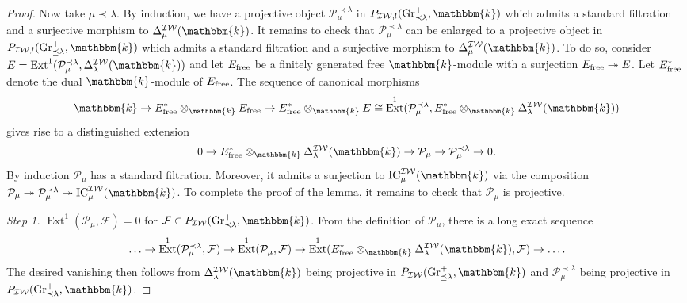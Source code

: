 \documentclass{amsart}
\renewcommand{\k}{\mathbbm{k}}
\newcommand{\scrF}{\mathcal{F}}
\newcommand{\scrP}{\mathcal{P}}
\newcommand{\IW}{\mathcal{IW}}
\DeclareMathOperator{\Ext}{Ext}
\DeclareMathOperator{\IC}{IC}
\DeclareMathOperator{\Gr}{Gr}
\theoremstyle{definition}
\begin{document}
\begin{proof}
        Now take $\mu \prec \lambda$. By induction, we have a projective object $\scrP_{\mu}^{\prec \lambda}$ in $P_{\IW, !} (\Gr_{\prec \lambda}^+, \k)$ which admits a standard filtration and a surjective morphism to $\Delta_{\mu}^{\IW} (\k)$.
        It remains to check that $\scrP_{\mu}^{\prec \lambda}$ can be enlarged to a projective object in  $P_{\IW, !} (\Gr_{\preceq \lambda}^+, \k)$ which admits a standard filtration and a surjective morphism to $\Delta_{\mu}^{\IW} (\k)$.
        To do so, consider $E = \Ext^1 (\scrP_{\mu}^{\prec \lambda}, \Delta_{\lambda}^{\IW} (\k))$ and let $E_{\textnormal{free}}$ be a finitely generated free $\k$-module with a surjection $E_{\textnormal{free}} \twoheadrightarrow E$.
        Let $E_{\textnormal{free}}^*$ denote the dual $\k$-module of $E_{\textnormal{free}}$.
        The sequence of canonical morphisms
        \[\k \to E_{\textnormal{free}}^* \otimes_{\k} E_{\textnormal{free}} \to E_{\textnormal{free}}^* \otimes_{\k} E \cong \Ext^1 (\scrP_{\mu}^{\prec \lambda}, E_{\textnormal{free}}^* \otimes_{\k} \Delta_{\lambda}^{\IW} (\k))\]
        gives rise to a distinguished extension
        \[0 \to E_{\textnormal{free}}^* \otimes_{\k} \Delta_{\lambda}^{\IW} (\k) \to \scrP_{\mu} \to \scrP_{\mu}^{\prec \lambda} \to 0.\]
        By induction $\scrP_{\mu}$ has a standard filtration. Moreover, it admits a surjection to $\IC_{\mu}^{\IW} (\k)$ via the composition $\scrP_{\mu} \twoheadrightarrow \scrP_{\mu}^{\prec \lambda} \twoheadrightarrow \IC_{\mu}^{\IW} (\k)$.
        To complete the proof of the lemma, it remains to check that $\scrP_{\mu}$ is projective. 

        \emph{Step 1.} $\Ext^1 (\scrP_{\mu}, \scrF) = 0$ for $\scrF \in P_{\IW} (\Gr_{\prec \lambda}^+, \k)$. From the definition of $\scrP_{\mu}$, there is a long exact sequence
        \[\ldots \to \Ext^1 (\scrP_{\mu}^{\prec \lambda}, \scrF) \to \Ext^1 (\scrP_{\mu}, \scrF) \to \Ext^1 (E_{\textnormal{free}}^* \otimes_{\k} \Delta_{\lambda}^{\IW} (\k), \scrF ) \to \ldots.\]
        The desired vanishing then follows from $\Delta_{\lambda}^{\IW} (\k)$ being projective in $P_{\IW} (\Gr_{\preceq \lambda}^+, \k)$ and $\scrP_{\mu}^{\prec \lambda}$ being projective in $P_{\IW} (\Gr_{\prec \lambda}^+, \k)$.


\end{proof}
\end{document}
